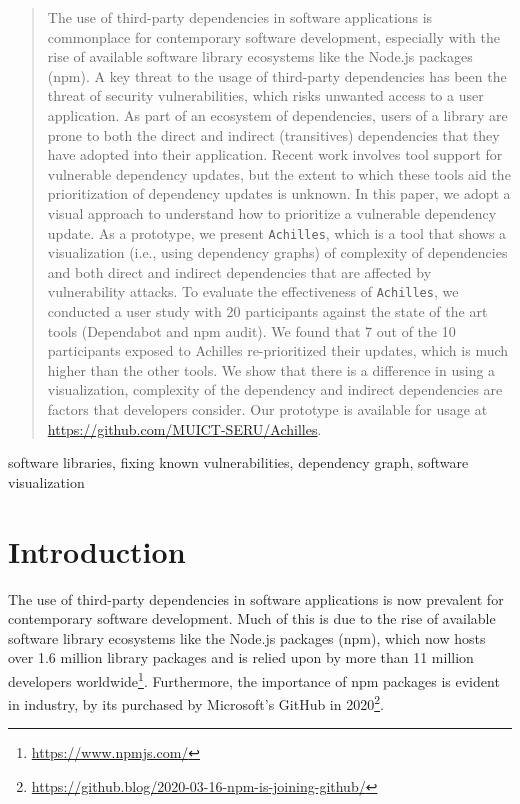\documentclass[conference]{IEEEtran}
\begin{document}
	\begin{abstract}
		The use of third-party dependencies in software applications is commonplace for contemporary software development, especially with the rise of available software library ecosystems like the Node.js packages (npm). 
		A key threat to the usage of third-party dependencies has been the threat of security vulnerabilities, which risks unwanted access to a user application. 
		As part of an ecosystem of dependencies, users of a library are prone to both the direct and indirect (transitives) dependencies that they have adopted into their application. 
		Recent work involves tool support for vulnerable dependency updates, but the extent to which these tools aid the prioritization of dependency updates is unknown. 
		In this paper, we adopt a visual approach to understand how to prioritize a vulnerable dependency update.
		As a prototype, we present \texttt{Achilles}, which is a tool that shows a visualization (i.e., using dependency graphs) of complexity of dependencies and both direct and indirect dependencies that are affected by vulnerability attacks.
		To evaluate the effectiveness of \texttt{Achilles}, we conducted a user study with 20 participants against the state of the art tools (Dependabot and npm audit).
		We found that 7 out of the 10 participants exposed to Achilles re-prioritized their updates, which is much higher than the other tools.
		We show that there is a difference in using a visualization, complexity of the dependency and indirect dependencies are factors that developers consider. 
		Our prototype is available for usage at \url{https://github.com/MUICT-SERU/Achilles}.
	\end{abstract}
	
	\begin{IEEEkeywords}
		software libraries, fixing known vulnerabilities, dependency graph, software visualization
	\end{IEEEkeywords}
	
	\section{Introduction}
	The use of third-party dependencies in software applications is now prevalent for contemporary software development. 
	Much of this is due to the rise of available software library ecosystems like the Node.js packages (npm), which now hosts over 1.6 million library packages and is relied upon by more than 11 million developers worldwide\footnote{\url{https://www.npmjs.com/}}.
	Furthermore, the importance of npm packages is evident in industry, by its purchased by Microsoft's GitHub in 2020\footnote{\url{https://github.blog/2020-03-16-npm-is-joining-github/}}.
	
\end{document}
